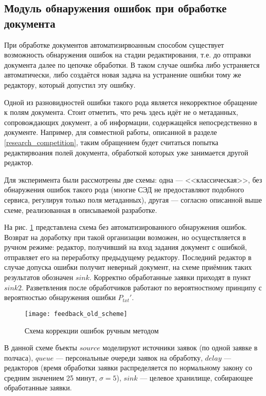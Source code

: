 \subsection{Модуль обнаружения ошибок при обработке документа} \label{research_feedback}

При обработке документов автоматизирвоанным способом существует возможность обнаружения ошибок на стадии редактирования, т.е. до отправки документа далее по цепочке обработки. В таком случае ошибка либо устраняется автоматически, либо создаётся новая задача на устранение ошибки тому же редактору, который допустил эту ошибку.

\vspace{\baselineskip}
Одной из разновидностей ошибки такого рода является некорректное обращение к полям документа. Стоит отметить, что речь здесь идёт не о метаданных, сопровождающих документ, а об информации, содержащейся непосредственно в документе. Например, для совместной работы, описанной в разделе \ref{research_competition}, таким обращением будет считаться попытка редактирвоания полей документа, обработкой которых уже занимается другой редактор.

\vspace{\baselineskip}
Для эксперимента были рассмотрены две схемы: одна --- <<классическая>>, без обнаружения ошибок такого рода (многие СЭД не предоставляют подобного сервиса, регулируя только поля метаданных), другая --- согласно описанной выше схеме, реализованная в описываемой разработке.

\vspace{\baselineskip}
На рис. \ref{img:feedback_old_scheme} представлена схема без автоматизированного обнаружения ошибок. Возврат на доработку при такой организации возможен, но осуществляется в ручном режиме: редактор, получивший на вход задания документ с ошибкой, отправляет его на переработку предыдущему редактору. Последний редактор в случае допуска ошибки получит неверный документ, на схеме приёмник таких результатов обозначен $sink$. Корректно обработанные заявки приходят в пункт $sink2$. Разветвления после обработчиков работают по вероятностному принципу с вероятностью обнаружения ошибки $P_{txt}'$.
 
\begin{figure}[h!]
  \centering
  \texttt{[image: feedback\_old\_scheme]}
  \caption{Схема коррекции ошибок ручным методом}
  \label{img:feedback_old_scheme}
\end{figure}

\vspace{\baselineskip}
В данной схеме бъекты $source$ моделируют источники заявок (по одной заявке в полчаса), $queue$ --- персональные очереди заявок на обработку, $delay$ --- редакторов (время обработки заявки распределяется по нормальному закону со средним значением 25 минут, $\sigma=5$), $sink$ --- целевое хранилище, собирающее обработанные заявки.

